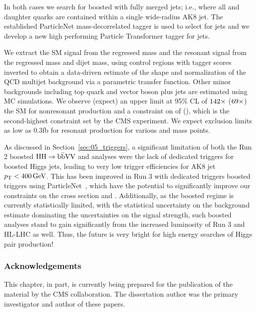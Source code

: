 In both cases we search for boosted \HHY with fully merged jets; i.e., where all \PH and \PY daughter quarks are contained within a single wide-radius AK8 jet.
The established ParticleNet mass-decorrelated tagger is used to select for \hbb jets and we develop a new high performing Particle Transformer tagger for \hyvv jets.

We extract the SM \HH signal from the \hbb regressed mass and the resonant \XHY signal from the \yww regressed mass and dijet \PX mass, using control regions with tagger scores inverted to obtain a data-driven estimate of the shape and normalization of the QCD multijet background via a parametric transfer function.
Other minor backgrounds including top quark and vector boson plus jets are estimated using MC simulations.
We observe (expect) an upper limit at 95\% CL of $142\times$ ($69\times$) the SM for nonresonant \HHbbVVq production and a constraint on \kapvv of \kvvobslims (\kvvexplims), which is the second-highest constraint set by the CMS experiment.
We expect exclusion limits as low as 0.3fb for resonant \XHYbbVVq production for various \mx and \my mass points.

As discussed in Section~\ref{sec:05_triggers}, a significant limitation of both the Run 2 boosted ${\textrm{H}\textrm{H}}\to\textrm{b}\bar{\textrm{b}}\textrm{V}\textrm{V}$ and \bbbb analyses were the lack of dedicated triggers for boosted Higgs jets, leading to very low trigger efficiencies for AK8 jet $p_{\mathrm{T}} < 400\,\text{Ge\hspace{-.08em}V}$.
This has been improved in Run 3 with dedicated triggers boosted \hbb triggers using ParticleNet~\cite{Varghese:2023bue}, which have the potential to significantly improve our constraints on the \HH cross section and \kapvv.
Additionally, as the boosted regime is currently statistically limited, with the statistical uncertainty on the background estimate dominating the uncertainties on the signal strength, such boosted \HH analyses stand to gain significantly from the increased luminosity of Run 3 and HL-LHC as well.
Thus, the future is very bright for high energy searches of Higgs pair production!

\subsubsection{Acknowledgements}

This chapter, in part, is currently being prepared for the publication of the material by the CMS collaboration.
The dissertation author was the primary investigator and author of these papers.
